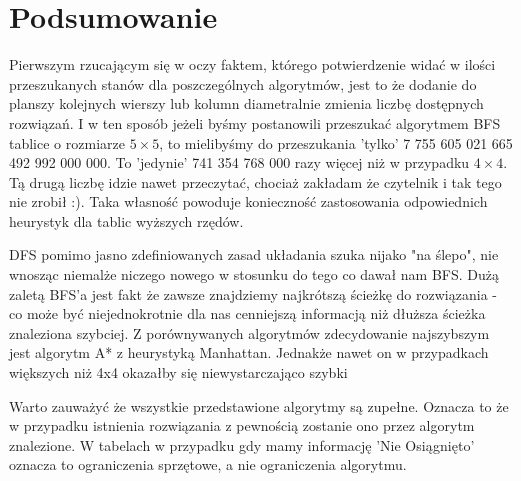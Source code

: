 \documentclass{classrep}
\begin{document}
\section{Podsumowanie}
Pierwszym rzucającym się w oczy faktem, którego potwierdzenie widać w ilości przeszukanych stanów dla poszczególnych algorytmów, jest to że dodanie do planszy kolejnych wierszy lub kolumn diametralnie zmienia liczbę dostępnych rozwiązań. I w ten sposób jeżeli byśmy postanowili przeszukać algorytmem BFS tablice o rozmiarze $5 \times 5$, to mielibyśmy do przeszukania 'tylko' 7 755 605 021 665 492 992 000 000. To 'jedynie' 741 354 768 000 razy więcej niż w przypadku $4 \times 4$. Tą drugą liczbę idzie nawet przeczytać, chociaż zakładam że czytelnik i tak tego nie zrobił :). Taka własność powoduje konieczność zastosowania odpowiednich heurystyk dla tablic wyższych rzędów.

DFS pomimo jasno zdefiniowanych zasad układania szuka nijako "na ślepo", nie wnosząc niemalże niczego nowego w stosunku do tego co dawał nam BFS. Dużą zaletą BFS'a jest fakt że zawsze znajdziemy najkrótszą ścieżkę do rozwiązania - co może być niejednokrotnie dla nas cenniejszą informacją niż dłuższa ścieżka znaleziona szybciej. Z porównywanych algorytmów zdecydowanie najszybszym jest algorytm A* z heurystyką Manhattan. Jednakże nawet on w przypadkach większych niż 4x4 okazałby się niewystarczająco szybki

Warto zauważyć że wszystkie przedstawione algorytmy są zupełne. Oznacza to że w przypadku istnienia rozwiązania z pewnością zostanie ono przez algorytm znalezione. W tabelach w przypadku gdy mamy informację 'Nie Osiągnięto' oznacza to ograniczenia sprzętowe, a nie ograniczenia algorytmu.




\end{document}
